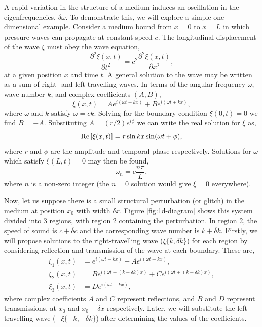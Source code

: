 A rapid variation in the structure of a medium induces an oscillation in the eigenfrequencies, \(\delta\omega\). To demonstrate this, we will explore a simple one-dimensional example. Consider a medium bound from \(x=0\) to \(x=L\) in which pressure waves can propagate at constant speed \(c\). The longitudinal displacement of the wave \(\xi\) must obey the wave equation,
%
\begin{equation}
    \frac{\partial^2\xi(x, t)}{\partial t^2} = c^2 \frac{\partial^2\xi(x, t)}{\partial x^2},
\end{equation}
%
at a given position \(x\) and time \(t\). A general solution to the wave may be written as a sum of right- and left-travelling waves. In terms of the angular frequency \(\omega\), wave number \(k\), and complex coefficients \((A, B)\),
%
\begin{equation}
    \xi(x, t) = A e^{i (\omega t - k x)} + B e^{i (\omega t + k x)},
\end{equation}
%
where \(\omega\) and \(k\) satisfy \(\omega = c k\). Solving for the boundary condition \(\xi(0, t) = 0\) we find \(B = - A\). Substituting \(A = (r/2) e^{i\phi}\) we can write the real solution for \(\xi\) as,
%
\begin{equation}
    {\mathrm{Re}}\left[\xi(x, t)\right] = r \sin k x \sin(\omega t + \phi),
\end{equation}
%
where \(r\) and \(\phi\) are the amplitude and temporal phase respectively. Solutions for \(\omega\) which satisfy \(\xi(L, t)=0\) may then be found,
%
\begin{equation}
    \omega_n = c \frac{n \pi}{L}, \label{eq:omega-n}
\end{equation}
%
where \(n\) is a non-zero integer (the \(n=0\) solution would give \(\xi=0\) everywhere).

Now, let us suppose there is a small structural perturbation (or glitch) in the medium at position \(x_0\) with width \(\delta x\). Figure \ref{fig:1d-diagram} shows this system divided into 3 regions, with region 2 containing the perturbation. In region 2, the speed of sound is \(c + \delta c\) and the corresponding wave number is \(k + \delta k\). Firstly, we will propose solutions to the right-travelling wave (\(\xi\{k, \delta k\}\)) for each region by considering reflection and transmission of the wave at each boundary. These are,
%
\begin{align}
    \xi_1(x, t) &= e^{i(\omega t - k x)} + A e^{i(\omega t + k x)}, \label{eq:xi1-r} \\
    \xi_2(x, t) &= Be^{i(\omega t - (k + \delta k) x)} + C e^{i(\omega t + (k + \delta k) x)}, \label{eq:xi2-r} \\
    \xi_3(x, t) &= D e^{i(\omega t - k x)}, \label{eq:xi3-r}
\end{align}
%
where complex coefficients \(A\) and \(C\) represent reflections, and \(B\) and \(D\) represent transmissions, at \(x_0\) and \(x_0 + \delta x\) respectively. Later, we will substitute the left-travelling wave (\(- \xi\{-k, -\delta k\}\)) after determining the values of the coefficients.

